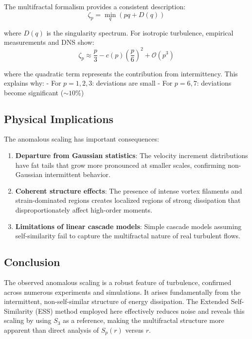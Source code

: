 \documentclass[12pt]{article}
\begin{document}
The multifractal formalism provides a consistent description:
\begin{equation}
\zeta_p = \min_q \left( pq + D(q) \right)
\end{equation}

where $D(q)$ is the singularity spectrum. For isotropic turbulence, empirical measurements and DNS show:
\begin{equation}
\zeta_p \approx \frac{p}{3} - c(p) \left( \frac{p}{6} \right)^2 + \mathcal{O}(p^3)
\end{equation}

where the quadratic term represents the contribution from intermittency. This explains why:
- For $p=1,2,3$: deviations are small
- For $p=6,7$: deviations become significant ($\sim 10\%$)

\subsection*{Physical Implications}

The anomalous scaling has important consequences:

\begin{enumerate}
    \item \textbf{Departure from Gaussian statistics}: The velocity increment distributions have fat tails that grow more pronounced at smaller scales, confirming non-Gaussian intermittent behavior.
    
    \item \textbf{Coherent structure effects}: The presence of intense vortex filaments and strain-dominated regions creates localized regions of strong dissipation that disproportionately affect high-order moments.
    
    \item \textbf{Limitations of linear cascade models}: Simple cascade models assuming self-similarity fail to capture the multifractal nature of real turbulent flows.
\end{enumerate}

\subsection*{Conclusion}

The observed anomalous scaling is a robust feature of turbulence, confirmed across numerous experiments and simulations. It arises fundamentally from the intermittent, non-self-similar structure of energy dissipation. The Extended Self-Similarity (ESS) method employed here effectively reduces noise and reveals this scaling by using $S_3$ as a reference, making the multifractal structure more apparent than direct analysis of $S_p(r)$ versus $r$.
\end{document}
